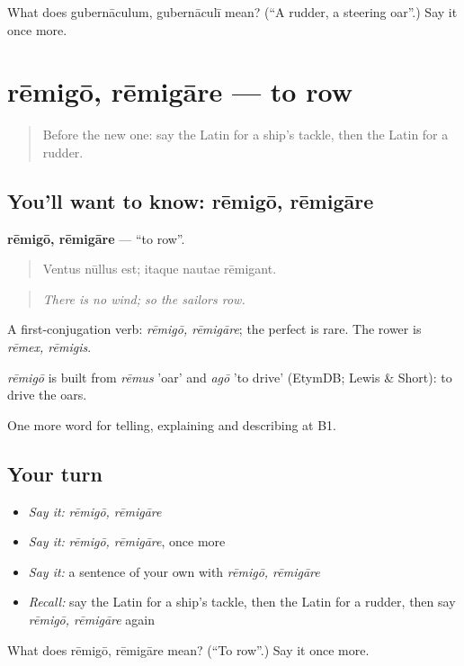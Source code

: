 \begin{tcolorbox}[breakable,colback=teal!4,colframe=teal!35!black,title={Before you move on}]
What does gubernāculum, gubernāculī mean? (\textquotedblleft{}A rudder, a steering oar\textquotedblright{}.) Say it once more.
\end{tcolorbox}
\section[rēmigō, rēmigāre]{rēmigō, rēmigāre — to row}

\label{lesson:LA-C437-remigo}



\begin{quote}
Before the new one: say the Latin for a ship's tackle, then the Latin for a rudder.
\end{quote}

\subsection*{You'll want to know: rēmigō, rēmigāre}
\textbf{rēmigō, rēmigāre} — \textquotedblleft{}to row\textquotedblright{}.

\begin{quote}
Ventus nūllus est; itaque nautae rēmigant.
\end{quote}

\begin{quote}
\emph{There is no wind; so the sailors row.}
\end{quote}

A first-conjugation verb: \emph{rēmigō, rēmigāre}; the perfect is rare. The rower is \emph{rēmex, rēmigis}.

\begin{cousinweb}
\emph{rēmigō} is built from \emph{rēmus} 'oar' and \emph{agō} 'to drive' (EtymDB; Lewis \& Short): to drive the oars.
\end{cousinweb}

\begin{grammarlens}[title={What you've built}]
One more word for telling, explaining and describing at B1.
\end{grammarlens}

\subsection*{Your turn}
\begin{itemize}
\raggedright
  \item \emph{Say it:} \emph{rēmigō, rēmigāre}
  \item \emph{Say it:} \emph{rēmigō, rēmigāre}, once more
  \item \emph{Say it:} a sentence of your own with \emph{rēmigō, rēmigāre}
  \item \emph{Recall:} say the Latin for a ship's tackle, then the Latin for a rudder, then say \emph{rēmigō, rēmigāre} again
\end{itemize}

\begin{tcolorbox}[breakable,colback=teal!4,colframe=teal!35!black,title={Before you move on}]
What does rēmigō, rēmigāre mean? (\textquotedblleft{}To row\textquotedblright{}.) Say it once more.
\end{tcolorbox}
